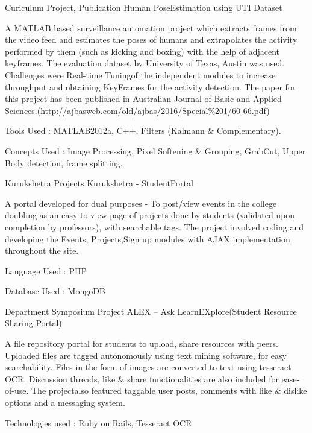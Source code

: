 \begin{cventries}
  \cventry
    {Curiculum Project, Publication} %
    {Human​ Pose​ Estimation​ using​ UTI​ Dataset} %
    {} %
    {} %
    {
      \begin{cvitems}
      \item{A MATLAB based surveillance automation project which extracts frames from the video feed and estimates the poses of humans and extrapolates the activity performed by them (such as kicking and boxing) with the help of   adjacent keyframes. The evaluation dataset by University of Texas, Austin was used. Challenges were Real-time   Tuning​ of​ the​ independent​ modules​ to​ increase​ throughput​ and​ obtaining​ Key​ Frames​ for​ the​ activity​ detection.}
      The paper for this project has been published in Australian Journal of Basic and Applied Sciences.(http://ajbasweb.com/old/ajbas/2016/Special\%201/60-66.pdf)
      \item{Tools​​ Used​ : MATLAB2012a,​ C++,​ Filters​ (Kalmann​ \& Complementary).}
      \item{Concepts​ Used​ : Image​ Processing,​ Pixel​ Softening​ \& Grouping,​ GrabCut,​ Upper​ Body​ detection,​ frame​ splitting.}
      \end{cvitems}
    }

  \cventry
    {Kurukshetra Projects} %
    {Kurukshetra​ - Student​ Portal} %
    {} %
    {} %
    {
      \begin{cvitems}
      \item{A portal developed for dual purposes - To post/view events in the college doubling as an easy-to-view page of projects done by students (validated upon completion by professors), with searchable tags. The project involved coding​ and​ developing​ the​ Events,​ Projects,​ Sign​ up​ modules​ with​ AJAX​ implementation​ throughout​ the​ site.}
      \item{Language​ Used​ : PHP}
      \item{Database​ Used​ : MongoDB}
      \end{cvitems}
    }

  \cventry
    {Department Symposium Project} %
    {ALEX​ – Ask​ Learn​ EXplore(Student​ Resource​ Sharing​ Portal)} %
    {} %
    {} %
    {
      \begin{cvitems}
      \item{A file repository portal for students to upload, share resources with peers. Uploaded files are tagged autonomously using text mining software, for easy searchability. Files in the form of images are converted to text using tesseract OCR. Discussion threads, like \& share functionalities are also included for ease-of-use. The project​ also​ featured​ taggable​ user​ posts,​ comments​ with​ like​ \& dislike​ options​ and​ a messaging​ system. }
      \item{Technologies​ used​ : Ruby​ on​ Rails,​ Tesseract​ OCR}
      \end{cvitems}
    }
\end{cventries}
